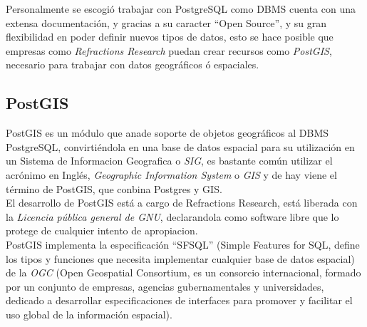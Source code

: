       Personalmente se escogió trabajar con  PostgreSQL como DBMS cuenta con una extensa documentación,  y gracias a su caracter ``Open Source'', y su gran flexibilidad en poder definir nuevos tipos de datos, esto se hace posible que empresas como \emph{Refractions Research} puedan crear recursos como \emph{PostGIS}, necesario para trabajar con datos geográficos \'o espaciales.




    \subsection{PostGIS} %
    \label{sec:postgis}

      PostGIS es un módulo  que anade soporte de objetos geográficos al DBMS PostgreSQL, convirtiéndola en una base de datos espacial para su utilización en un Sistema de Informacion Geografica o \emph{SIG}, es bastante común utilizar el acrónimo en Inglés, \emph{Geographic Information System} o \emph{GIS} y de hay viene el término de PostGIS, que conbina Postgres y GIS.\\

      El desarrollo de PostGIS está a cargo de Refractions Research, está liberada con la \emph{Licencia pública general de GNU}, declarandola como software libre que lo protege de cualquier intento de apropiacion.\\

      PostGIS implementa la especificaci\'on ``SFSQL'' (Simple Features for SQL, define los tipos y funciones que necesita implementar cualquier base de datos espacial) de la \emph{OGC} (Open Geospatial Consortium, es un consorcio internacional, formado por un conjunto de empresas, agencias gubernamentales y universidades, dedicado a desarrollar especificaciones de interfaces para promover y facilitar el uso global de la información espacial).\\

